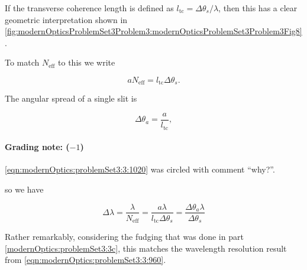 {If the transverse coherence length is defined as $l_{\mathrm{tc}} = \Delta \theta_s/\lambda$, then this has a clear geometric interpretation shown in \cref{fig:modernOpticsProblemSet3Problem3:modernOpticsProblemSet3Problem3Fig8}.


To match $N_{\mathrm{eff}}$ to this we write

\begin{dmath}\label{eqn:modernOptics:problemSet3:3:1000}
a N_{\mathrm{eff}} = l_{\mathrm{tc}} \Delta \theta_s.
\end{dmath}

The angular spread of a single slit is

\begin{dmath}\label{eqn:modernOptics:problemSet3:3:1020}
\Delta \theta_a = \frac{a}{l_{\mathrm{tc}}},
\end{dmath}

\paragraph{Grading note: ($-1$)}
\ref{eqn:modernOptics:problemSet3:3:1020} was circled with comment ``why?''.

so we have

\begin{dmath}\label{eqn:modernOptics:problemSet3:3:1040}
\Delta \lambda
= \frac{\lambda}{ N_{\mathrm{eff}} }
= \frac{a \lambda}{
l_{\mathrm{tc}} \Delta \theta_s
}
=
\frac{\Delta \theta_a \lambda}{
\Delta \theta_s
}
\end{dmath}

Rather remarkably, considering the fudging that was done in part \ref{modernOptics:problemSet3:3c}, this matches the wavelength resolution result from \ref{eqn:modernOptics:problemSet3:3:960}.

} %
